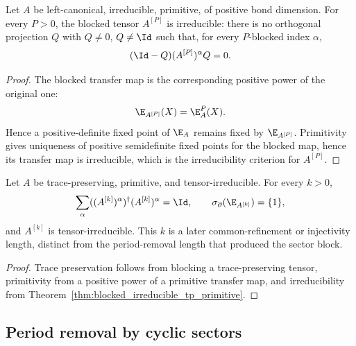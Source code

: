 \begin{theorem}%
    \label{thm:blocked_irreducible_tp_primitive}
    \leanok
    Let $A$ be left-canonical, irreducible, primitive, of positive bond
    dimension. For every $P>0$, the blocked tensor $A^{[P]}$ is irreducible:
    there is no orthogonal projection $Q$ with $Q \ne 0$, $Q \ne \Id$ such that,
    for every $P$-blocked index $\alpha$,
    \[
        (\Id-Q)(A^{[P]})^\alpha Q=0.
    \]
\end{theorem}

\begin{proof}\leanok
    The blocked transfer map is the corresponding positive power of the original
    one:
    \[
        \E_{A^{[P]}}(X)=\E_A^P(X).
    \]
    Hence a positive-definite fixed point of $\E_A$ remains fixed by
    $\E_{A^{[P]}}$. Primitivity gives uniqueness of positive semidefinite fixed
    points for the blocked map, hence its transfer map is irreducible, which is
    the irreducibility criterion for $A^{[P]}$.
\end{proof}

\begin{theorem}%
    \label{thm:tp_primitive_irreducible_extra_blocking}
    \leanok
    Let $A$ be trace-preserving, primitive, and tensor-irreducible. For every
    $k>0$,
    \[
        \sum_\alpha ((A^{[k]})^\alpha)^\dagger
        (A^{[k]})^\alpha = \Id,
        \qquad
        \sigma_\partial(\E_{A^{[k]}})=\{1\},
    \]
    and $A^{[k]}$ is tensor-irreducible. This $k$ is a later
    common-refinement or injectivity length, distinct from the period-removal
    length that produced the sector block.
\end{theorem}

\begin{proof}\leanok
    Trace preservation follows from blocking a trace-preserving tensor,
    primitivity from a positive power of a primitive transfer map, and
    irreducibility from Theorem~\ref{thm:blocked_irreducible_tp_primitive}.
\end{proof}

\subsection{Period removal by cyclic sectors}%
\label{sec:cyclic_sectors}

